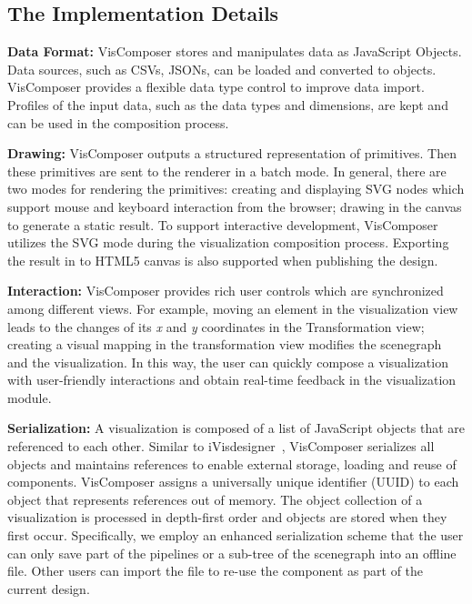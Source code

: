 \subsection{The Implementation Details}

\indent \textbf{Data Format:} VisComposer stores and manipulates data as JavaScript Objects. Data sources, such as CSVs, JSONs, can be loaded and converted to objects. VisComposer provides a flexible data type control to improve data import. Profiles of the input data, such as the data types and dimensions, are kept and can be used in the composition process.

\noindent \textbf{Drawing:} VisComposer outputs a structured representation of primitives.  Then these primitives are sent to the renderer  in a batch mode. In general, there are two modes for rendering the primitives: creating and displaying SVG nodes which support mouse and keyboard interaction from the browser; drawing in the canvas to generate a static result. To support interactive development, VisComposer utilizes the SVG mode during the visualization composition process. Exporting the result in to HTML5 canvas is also supported when publishing the design.

\noindent \textbf{Interaction:} VisComposer provides rich user controls which are synchronized among different views. For example, moving an element in the visualization view leads to the changes of its \emph{x} and \emph{y} coordinates in the Transformation view; creating a visual mapping in the transformation view modifies the  scenegraph and the visualization.
In this way, the user can quickly compose a visualization with user-friendly interactions and obtain real-time feedback in the visualization module.

\noindent \textbf{Serialization:} A visualization is composed of a list of JavaScript objects that are referenced to each other. Similar to iVisdesigner~\cite{Yuan:2014:TVCG}, VisComposer serializes all objects and maintains references to enable external storage, loading and reuse of components. VisComposer assigns a universally unique identifier (UUID) to each object that represents references out of memory. The  object collection of a visualization is processed in depth-first order and objects are stored when they first occur. Specifically, we employ an enhanced serialization scheme that the user can only save part of the pipelines or a sub-tree of the scenegraph into an offline file. Other users can import the file to re-use the component as part of the current design.

